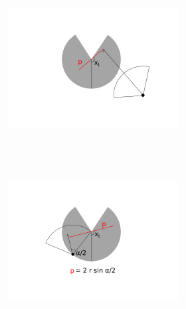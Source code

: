 \documentclass[a4paper,10pt,reqno,oneside]{amsart}
\begin{document}
\begin{figure}[t]
        \captionsetup{width=14cm}
        \captionsetup[subfigure]{labelformat=empty} %
        \centering
	\begin{subfigure}[t]{60mm}
                \centering
		\includegraphics[width=45mm, trim= 6cm 7cm 6cm 4cm]{imgs/x1.pdf}
                \caption{}
                \label{f:xOne}
        \end{subfigure}%
	~ 
	\begin{subfigure}[t]{60mm}
                \centering
		\includegraphics[width=45mm, trim= 6cm 7cm 6cm 4cm]{imgs/firstIntegral.pdf}
                \caption{}
                \label{f:firstInt}
        \end{subfigure}%
	 

\end{figure}
\end{document}
